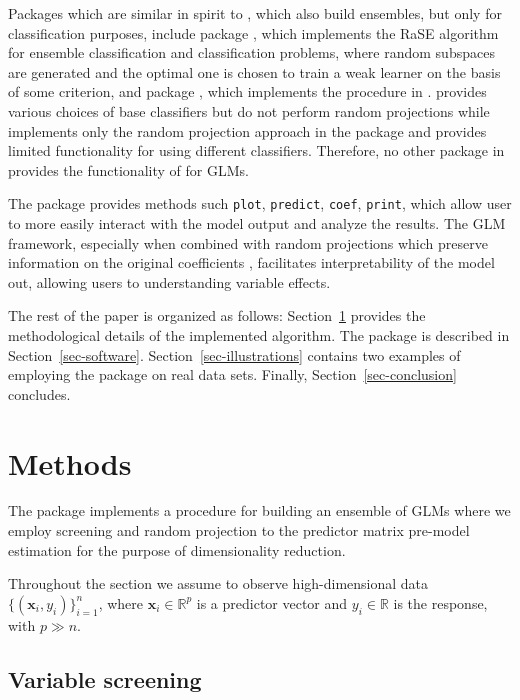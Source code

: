 \documentclass[
  article]{jss}
\begin{document}
Packages which are similar in spirit to , which also build
ensembles, but only for classification purposes, include package
 \citep{pkg:RaSEn}, which implements the RaSE algorithm for
ensemble classification and classification problems, where random
subspaces are generated and the optimal one is chosen to train a weak
learner on the basis of some criterion, and package 
\citep{pkg:RPEnsembleR}, which implements the procedure in
\citet{cannings2017random}.  provides various choices of base
classifiers but do not perform random projections while 
implements only the random projection approach in the package and
provides limited functionality for using different classifiers.
Therefore, no other package in  provides the functionality
of  for GLMs.

The package provides methods such \texttt{plot}, \texttt{predict},
\texttt{coef}, \texttt{print}, which allow user to more easily interact
with the model output and analyze the results. The GLM framework,
especially when combined with random projections which preserve
information on the original coefficients \citep[such as the one
in][]{parzer2024glms}, facilitates interpretability of the model out,
allowing users to understanding variable effects.

The rest of the paper is organized as follows: Section~\ref{sec-models}
provides the methodological details of the implemented algorithm. The
package is described in Section~\ref{sec-software}.
Section~\ref{sec-illustrations} contains two examples of employing the
package on real data sets. Finally, Section~\ref{sec-conclusion}
concludes.

\section{Methods}\label{sec-models}

The package implements a procedure for building an ensemble of GLMs
where we employ screening and random projection to the predictor matrix
pre-model estimation for the purpose of dimensionality reduction.

Throughout the section we assume to observe high-dimensional data
\(\{(\boldsymbol{x}_i,y_i)\}_{i=1}^n\), where
\(\boldsymbol{x}_i\in\mathbb{R}^p\) is a predictor vector and
\(y_i\in\mathbb{R}\) is the response, with \(p\gg n\).

\subsection{Variable screening}\label{variable-screening}
\end{document}
